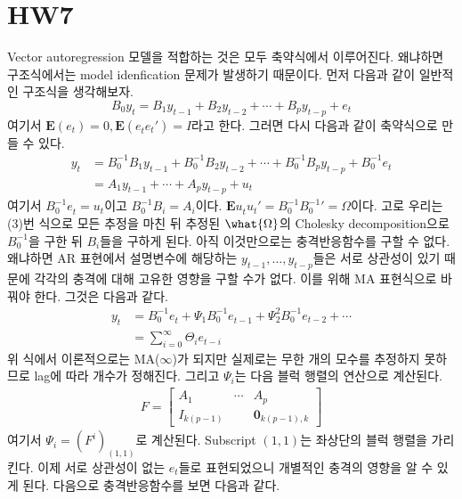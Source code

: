 \documentclass{article}
\begin{document}
\newpage
\section{HW7}
  Vector autoregression 모델을 적합하는 것은 모두 축약식에서 이루어진다. 왜냐하면 구조식에서는 model idenfication 문제가 발생하기 때문이다. 먼저 다음과 같이 일반적인 구조식을 생각해보자.
  \begin{equation}
    B_{0}y_{t} = B_{1}y_{t-1}+B_{2}y_{t-2}+\cdots + B_{p}y_{t-p}+ e_{t}
  \end{equation}
  여기서 $\mathbf{E}(e_{t})=0, \mathbf{E}(e_{t}^{}e_{t}')=I$라고 한다. 그러면 다시 다음과 같이 축약식으로 만들 수 있다.
  \begin{align}
    y_{t} &= B_{0}^{-1}B_{1}^{}y_{t-1}^{}+B_{0}^{-1}B_{2}^{}y_{t-2}^{}+\cdots+B_{0}^{-1}B_{p}^{}y_{t-p}^{} +B_{0}^{-1}e_{t}^{}\\
    &= A_{1}y_{t-1}+\cdots + A_{p}y_{t-p}+u_{t}
  \end{align}
  여기서 $B_{0}^{-1}e_{t}^{} = u_{t}$이고 $B_{0}^{-1}B_{i}^{} = A_{i}$이다. $\mathbf{E}u_{t}^{}u_{t}'=B_{0}^{-1}{B_{0}^{-1}}'=\Omega$이다. 고로 우리는 (3)번 식으로 모든 추정을 마친 뒤 추정된 $\what{\Omega}$의 Cholesky decomposition으로 $B_{0}^{-1}$을 구한 뒤 $B_{i}$들을 구하게 된다. 아직 이것만으로는 충격반응함수를 구할 수 없다. 왜냐하면 AR 표현에서 설명변수에 해당하는 $y_{t-1},\ldots,y_{t-p}$들은 서로 상관성이 있기 때문에 각각의 충격에 대해 고유한 영향을 구할 수가 없다. 이를 위해 MA 표현식으로 바꿔야 한다. 그것은 다음과 같다.
  \begin{align}
    y_{t} &= B_{0}^{-1}e_{t}^{}+\Psi_{1} B_{0}^{-1}e_{t-1}^{}+\Psi_{2}^{2}B_{0}^{-1}e_{t-2}+\cdots\\
    &= \sum_{i=0}^{\infty}\Theta_{i}e_{t-i}
  \end{align}
  위 식에서 이론적으로는 MA($\infty$)가 되지만 실제로는 무한 개의 모수를 추정하지 못하므로 lag에 따라 개수가 정해진다. 그리고 $\Psi_{i}$는 다음 블럭 행렬의 연산으로 계산된다.
  \begin{align}
    F = \begin{bmatrix}A_{1}& \cdots  &  A_{p}\\ I_{k(p-1)} & & \mathbf{0}_{k(p-1),k}  \end{bmatrix}
  \end{align}
  여기서 $\Psi_{i}=\left(F^{i}\right)_{(1,1)}$로 계산된다. Subscript $(1,1)$는 좌상단의 블럭 행렬을 가리킨다. 이제 서로 상관성이 없는 $e_{t}$들로 표현되었으니 개별적인 충격의 영향을 알 수 있게 된다.\newpage
  다음으로 충격반응함수를 보면 다음과 같다.
\end{document}
